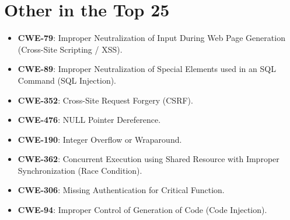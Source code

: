 \section{Other  in the Top 25}
\begin{itemize}
    \item \textbf{CWE-79}: Improper Neutralization of Input During Web Page Generation (Cross-Site Scripting / XSS).
    \item \textbf{CWE-89}: Improper Neutralization of Special Elements used in an SQL Command (SQL Injection).
    \item \textbf{CWE-352}: Cross-Site Request Forgery (CSRF).
    \item \textbf{CWE-476}: NULL Pointer Dereference.
    \item \textbf{CWE-190}: Integer Overflow or Wraparound.
    \item \textbf{CWE-362}: Concurrent Execution using Shared Resource with Improper Synchronization (Race Condition).
    \item \textbf{CWE-306}: Missing Authentication for Critical Function.
    \item \textbf{CWE-94}: Improper Control of Generation of Code (Code Injection).
\end{itemize}
